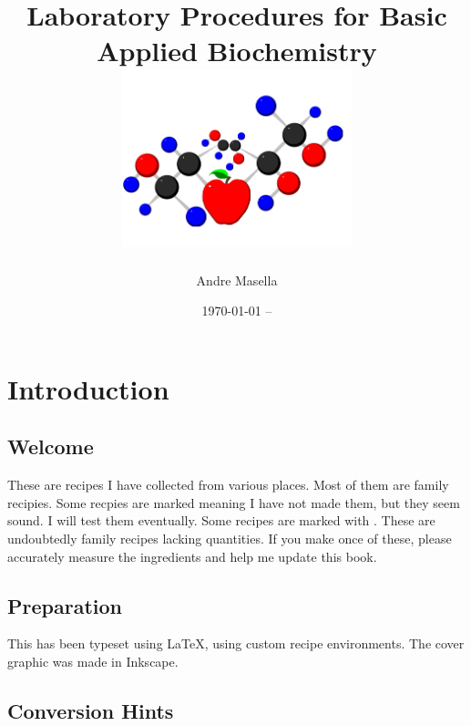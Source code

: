 \documentclass{book}
\begin{document}
\title{Laboratory Procedures for Basic Applied Biochemistry \\
\includegraphics[width=0.5\textwidth,angle=-90]{CoverLogo} 
}
\author{ Andre Masella }
\date{\today{} -- }
\maketitle

\tableofcontents

\chapter{ Introduction }

\section { Welcome }

These are recipes I have collected from various places. Most of them are
family recipies. Some recpies are marked \UNTESTED meaning I have not
made them, but they seem sound.  I will test them eventually. Some recipes are marked with \FIXME{}. These are undoubtedly family recipes lacking quantities. If you make once of these, please accurately measure the ingredients and help me update this book.\par

\section { Preparation }

This has been typeset using \LaTeX{}, using custom recipe environments.
The cover graphic was made in Inkscape.\par

\section { Conversion Hints }
\end{document}
